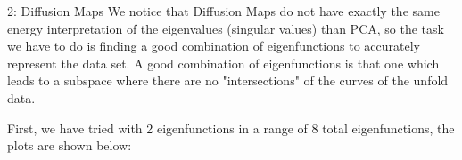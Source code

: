 \documentclass[10pt,a4paper]{article}
\begin{document}
\begin{task}{2: Diffusion Maps}
We notice that Diffusion Maps do not have exactly the same energy interpretation of the eigenvalues (singular values) than PCA, so the task we have to do is finding a good combination of eigenfunctions to accurately represent the data set. A good combination of eigenfunctions is that one which leads to a subspace where there are no "intersections" of the curves of the unfold data.  

First, we have tried with 2 eigenfunctions in a range of 8 total eigenfunctions, the plots are shown below: 

\begin{figure} [H]
\centering
\end{figure}


\end{task}
\end{document}
